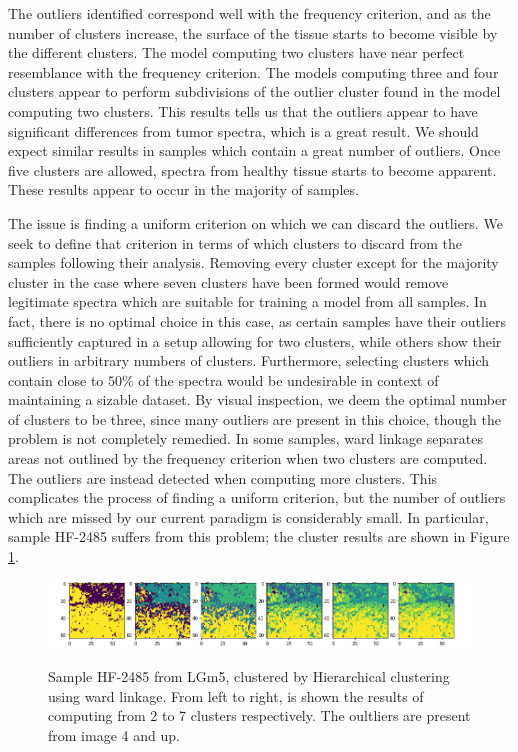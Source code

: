 The outliers identified correspond well with the frequency criterion, and as the number of clusters increase, the surface of the tissue starts to become visible by the different clusters. The model computing two clusters have near perfect resemblance with the frequency criterion. The models computing three and four clusters appear to perform subdivisions of the outlier cluster found in the model computing two clusters. This results tells us that the outliers appear to have significant differences from tumor spectra, which is a great result. We should expect similar results in samples which contain a great number of outliers. Once five clusters are allowed, spectra from healthy tissue starts to become apparent. These results appear to occur in the majority of samples.

The issue is finding a uniform criterion on which we can discard the outliers. We seek to define that criterion in terms of which clusters to discard from the samples following their analysis. Removing every cluster except for the majority cluster in the case where seven clusters have been formed would remove legitimate spectra which are suitable for training a model from all samples. In fact, there is no optimal choice in this case, as certain samples have their outliers sufficiently captured in a setup allowing for two clusters, while others show their outliers in arbitrary numbers of clusters. Furthermore, selecting clusters which contain close to $50\%$ of the spectra would be undesirable in context of maintaining a sizable dataset. By visual inspection, we deem the optimal number of clusters to be three, since many outliers are present in this choice, though the problem is not completely remedied. In some samples, ward linkage separates areas not outlined by the frequency criterion when two clusters are computed. The outliers are instead detected when computing more clusters. This complicates the process of finding a uniform criterion, but the number of outliers which are missed by our current paradigm is considerably small. In particular, sample HF-2485 suffers from this problem; the cluster results are shown in Figure \ref{fig:hf_2485}.

\begin{figure}[h]

    \centering
{\includegraphics[width=15cm]{images/Ward_linkage/LGm-5/HF-2485_V1B_1.h5_9.png} }
\caption{Sample HF-2485 from LGm5, clustered by Hierarchical clustering using ward linkage. From left to right, is shown the results of computing from 2 to 7 clusters respectively. The oultliers are present from image 4 and up.
\label{fig:hf_2485}}%
\end{figure}


